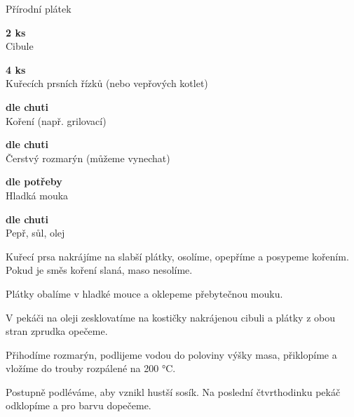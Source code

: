 \documentclass[11pt,a4paper]{article}
\begin{document}
\begin{recipe}[OliveDrab]{Přírodní plátek}
    \begin{ingredients}
        \item \parbox[t]{\linewidth}{\raggedright \piece \textbf{2 ks}\\ Cibule}
        \item \parbox[t]{\linewidth}{\raggedright \piece \textbf{4 ks}\\ Kuřecích prsních řízků (nebo vepřových kotlet)}
        \item \parbox[t]{\linewidth}{\raggedright \indefinite \textbf{dle chuti}\\ Koření (např. grilovací)}
        \item \parbox[t]{\linewidth}{\raggedright \indefinite \textbf{dle chuti}\\ Čerstvý rozmarýn (můžeme vynechat)}
        \item \parbox[t]{\linewidth}{\raggedright \weight \textbf{dle potřeby}\\ Hladká mouka}
        \item \parbox[t]{\linewidth}{\raggedright \indefinite \textbf{dle chuti}\\ Pepř, sůl, olej}
    \end{ingredients}
    \begin{steps}
        \item Kuřecí prsa nakrájíme na slabší plátky, osolíme, opepříme a posypeme kořením. Pokud je směs koření slaná, maso nesolíme.
        \item Plátky obalíme v hladké mouce a oklepeme přebytečnou mouku.
        \item V pekáči na oleji zesklovatíme na kostičky nakrájenou cibuli a plátky z obou stran zprudka opečeme.
        \item Přihodíme rozmarýn, podlijeme vodou do poloviny výšky masa, přiklopíme a vložíme do trouby rozpálené na 200 °C.
        \item Postupně podléváme, aby vznikl hustší sosík. Na poslední čtvrthodinku pekáč odklopíme a pro barvu dopečeme.
    \end{steps}
\end{recipe}
\end{document}
